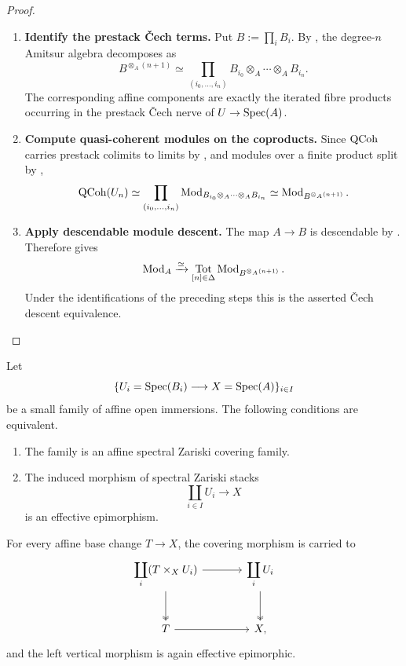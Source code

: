 \begin{proof}
\leavevmode
\begin{enumerate}[label=\textup{(\arabic*)}]
    \item \textbf{Identify the prestack \v{C}ech terms.}
    Put \(B:=\prod_iB_i\). By
    , the degree-\(n\) Amitsur algebra
    decomposes as
    \[
        B^{\otimes_A(n+1)}
        \simeq
        \prod_{(i_0,\ldots,i_n)}
        B_{i_0}\otimes_A\cdots\otimes_AB_{i_n}.
    \]
    The corresponding affine components are exactly the iterated fibre
    products occurring in the prestack \v{C}ech nerve of
    \(U\to\operatorname{Spec}(A)\).

    \item \textbf{Compute quasi-coherent modules on the coproducts.}
    Since \(\operatorname{QCoh}\) carries prestack colimits to limits by
    , and modules over a finite product split
    by ,
    \[
        \operatorname{QCoh}(U_n)
        \simeq
        \prod_{(i_0,\ldots,i_n)}
        \operatorname{Mod}_{B_{i_0}\otimes_A\cdots\otimes_AB_{i_n}}
        \simeq
        \operatorname{Mod}_{B^{\otimes_A(n+1)}}.
    \]

    \item \textbf{Apply descendable module descent.}
    The map \(A\to B\) is descendable by
    . Therefore
     gives
    \[
        \operatorname{Mod}_A
        \xrightarrow{\simeq}
        \operatorname*{Tot}_{[n]\in\Delta}
        \operatorname{Mod}_{B^{\otimes_A(n+1)}}.
    \]
    Under the identifications of the preceding steps this is the asserted
    \v{C}ech descent equivalence.
\end{enumerate}
\end{proof}

\begin{proposition}
\label{prop:affine-open-cover-effective-epi}
Let
\[
    \{U_i=\operatorname{Spec}(B_i)\longrightarrow X=\operatorname{Spec}(A)\}_{i\in I}
\]
be a small family of affine open immersions. The following conditions are
equivalent.
\begin{enumerate}[label=(\roman*)]
    \item The family is an affine spectral Zariski covering family.
    \item The induced morphism of spectral Zariski stacks
    \[
        \coprod_{i\in I}U_i
        \longrightarrow
        X
    \]
    is an effective epimorphism.
\end{enumerate}
For every affine base change \(T\to X\), the covering morphism is carried to
\[
\begin{tikzcd}[column sep=large, row sep=large]
    \displaystyle\coprod_i(T\times_XU_i)
        \arrow[r]
        \arrow[d, two heads]
    &
    \displaystyle\coprod_iU_i
        \arrow[d, two heads]
    \\
    T
        \arrow[r]
    &
    X,
\end{tikzcd}
\]
and the left vertical morphism is again effective epimorphic.
\end{proposition}

